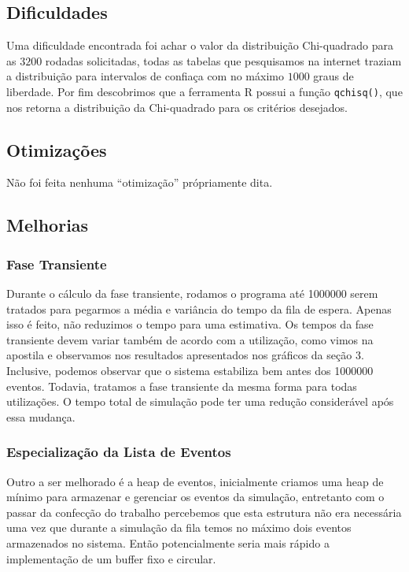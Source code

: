 \documentclass[a4paper]{article}
\newcommand{\inlcode}{\texttt}
\begin{document}
\subsection{Dificuldades}
Uma dificuldade encontrada foi achar o valor da distribuição
Chi-quadrado para as \(3200\) rodadas solicitadas, todas as
tabelas que pesquisamos na internet traziam a distribuição
para intervalos de confiaça com no máximo \(1000\) graus de
liberdade. Por fim descobrimos que a ferramenta R possui
a função \inlcode{qchisq()},
que nos retorna a distribuição da Chi-quadrado
para os critérios desejados.

\subsection{Otimizações}
Não foi feita nenhuma ``otimização'' própriamente dita.

\subsection{Melhorias}
\subsubsection{Fase Transiente}
Durante o cálculo da fase transiente,
rodamos o programa até 1000000 serem tratados
para pegarmos a média e variância do tempo da fila de espera.
Apenas isso é feito,
não reduzimos o tempo para uma estimativa.
Os tempos da fase transiente devem variar também de acordo
com a utilização,
como vimos na apostila e
observamos nos resultados apresentados nos gráficos da seção 3.
Inclusive, podemos observar que o sistema estabiliza
bem antes dos 1000000 eventos.
Todavia, tratamos a fase transiente da mesma forma
para todas utilizações.
O tempo total de simulação pode ter
uma redução considerável após essa mudança.

\subsubsection{Especialização da Lista de Eventos}
Outro a ser melhorado é a heap de eventos,
inicialmente criamos uma heap de mínimo
para armazenar e gerenciar os eventos da simulação,
entretanto com o passar da confecção do trabalho
percebemos que esta estrutura não era necessária uma vez que
durante a simulação da fila temos no máximo dois eventos
armazenados no sistema.
Então potencialmente seria mais rápido
a implementação de um buffer fixo e circular.
\end{document}
